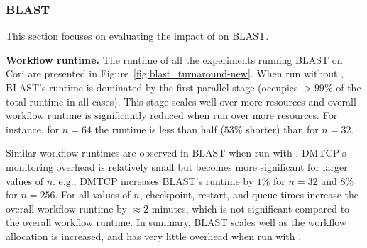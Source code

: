 \vspace{-0.3cm}
\subsubsection{BLAST}
This section focuses on evaluating the impact of \systemname on BLAST.

\noindent\textbf{Workflow runtime.}
The runtime of all the experiments running BLAST 
on Cori are presented in Figure~\ref{fig:blast_turnaround-new}.
When run without \systemname, 
BLAST's runtime is dominated by the first parallel stage  (\blastFirst occupies  $>99\%$
of the total runtime in all cases).
This stage scales well over more resources and overall workflow runtime is significantly reduced when run
over more resources.
For instance, for $n=64$ the runtime is less than half ($53\%$ shorter) than for $n=32$.

Similar workflow runtimes are observed in BLAST when run with \systemname.
DMTCP's monitoring overhead is relatively small but becomes more significant
for larger values of $n$. 
e.g., DMTCP increases BLAST's runtime by $1\%$ for $n=32$ and $8\%$ for $n=256$.
For all values of $n$,
 checkpoint, restart, and queue times increase the overall workflow runtime by 
$\approx 2$ minutes, which is not significant compared to the overall workflow runtime.
In summary, BLAST scales well as the workflow allocation is increased,
and has very little overhead when run with \systemname.


